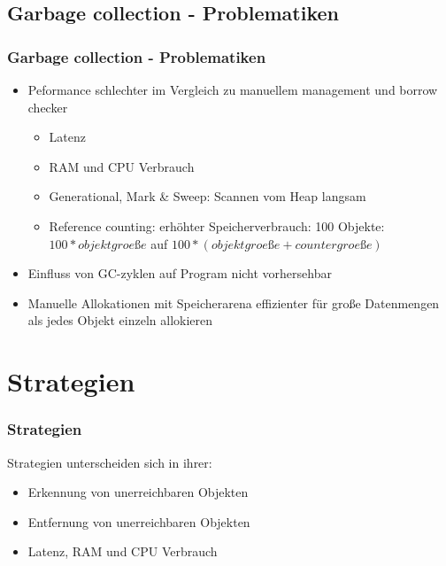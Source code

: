 \documentclass{beamer}
\begin{document}
        \subsection{Garbage collection - Problematiken}
            \begin{frame}
                \frametitle{Garbage collection - Problematiken}
                \begin{itemize}
                    \item Peformance schlechter im Vergleich zu manuellem
                        management und borrow checker
                        \begin{itemize}
                            \item Latenz 
                            \item RAM und CPU Verbrauch
                            \item Generational, Mark \& Sweep: Scannen vom Heap langsam
                            \item Reference counting: erhöhter Speicherverbrauch: 100 Objekte: $100*objektgroeße$ auf $100*(objektgroeße+countergroeße)$
                        \end{itemize}
                    \item Einfluss von GC-zyklen auf Program nicht vorhersehbar
                    \item Manuelle Allokationen mit Speicherarena effizienter
                        für große Datenmengen als jedes Objekt einzeln
                        allokieren
                \end{itemize}
            \end{frame}

    \section{Strategien}
        \begin{frame}
            \frametitle{Strategien}

            Strategien unterscheiden sich in ihrer:

            \begin{itemize}
                \item Erkennung von unerreichbaren Objekten
                \item Entfernung von unerreichbaren Objekten
                \item Latenz, RAM und CPU Verbrauch
            \end{itemize}
        \end{frame}
\end{document}
